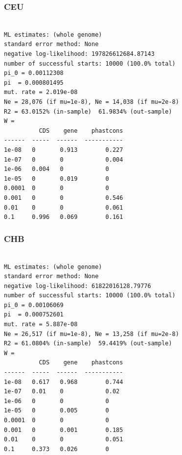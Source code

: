 \documentclass[11pt]{article}
\begin{document}
\subsubsection*{CEU}
\begin{minipage}{\linewidth}\begin{footnotesize}
\begin{verbatim}

ML estimates: (whole genome)
standard error method: None
negative log-likelihood: 197826612684.87143
number of successful starts: 10000 (100.0% total)
pi_0 = 0.00112308
pi  = 0.000801495
mut. rate = 2.019e-08 
Ne = 28,076 (if mu=1e-8), Ne = 14,038 (if mu=2e-8)
R2 = 63.0152% (in-sample)  61.9834% (out-sample)
W = 
          CDS    gene    phastcons
------  -----  ------  -----------
1e-08   0       0.913        0.227
1e-07   0       0            0.004
1e-06   0.004   0            0
1e-05   0       0.019        0
0.0001  0       0            0
0.001   0       0            0.546
0.01    0       0            0.061
0.1     0.996   0.069        0.161
\end{verbatim}
\end{footnotesize}\end{minipage}


\subsubsection*{CHB}
\begin{minipage}{\linewidth}\begin{footnotesize}
\begin{verbatim}

ML estimates: (whole genome)
standard error method: None
negative log-likelihood: 61822016128.79776
number of successful starts: 10000 (100.0% total)
pi_0 = 0.00106069
pi  = 0.000752601
mut. rate = 5.887e-08 
Ne = 26,517 (if mu=1e-8), Ne = 13,258 (if mu=2e-8)
R2 = 61.0804% (in-sample)  59.4419% (out-sample)
W = 
          CDS    gene    phastcons
------  -----  ------  -----------
1e-08   0.617   0.968        0.744
1e-07   0.01    0            0.02
1e-06   0       0            0
1e-05   0       0.005        0
0.0001  0       0            0
0.001   0       0.001        0.185
0.01    0       0            0.051
0.1     0.373   0.026        0
\end{verbatim}
\end{footnotesize}\end{minipage}
\end{document}
